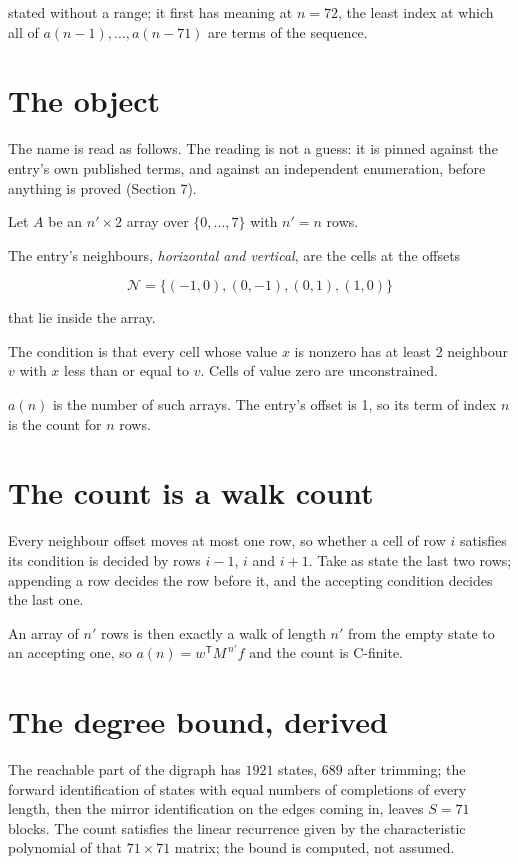 \documentclass[11pt]{article}
\theoremstyle{definition}
\begin{document}
stated without a range; it first has meaning at $n = 72$, the least index at which all of $a(n-1),\dots,a(n-71)$ are terms of the sequence.

\section{The object}

The name is read as follows. The reading is not a guess: it is pinned against the entry's own published terms, and against an independent enumeration, before anything is proved (Section 7).

Let $A$ be an $n' \times 2$ array over $\{0,\dots,7\}$ with $n' = n$ rows.

The entry's neighbours, {\itshape horizontal and vertical}, are the cells at the offsets

\[\mathcal{N} = \{(-1,0), (0,-1), (0,1), (1,0)\}\]

that lie inside the array.

The condition is that every cell whose value $x$ is nonzero has at least 2 neighbour $v$ with $x$ less than or equal to $v$. Cells of value zero are unconstrained.

$a(n)$ is the number of such arrays. The entry's offset is 1, so its term of index $n$ is the count for $n$ rows.

\section{The count is a walk count}

Every neighbour offset moves at most one row, so whether a cell of row $i$ satisfies its condition is decided by rows $i-1$, $i$ and $i+1$. Take as state the last two rows; appending a row decides the row before it, and the accepting condition decides the last one.

An array of $n'$ rows is then exactly a walk of length $n'$ from the empty state to an accepting one, so $a(n) = w^{\mathsf T}M^{\,n'}f$ and the count is C-finite.

\section{The degree bound, derived}

The reachable part of the digraph has $1921$ states, $689$ after trimming; the forward identification of states with equal numbers of completions of every length, then the mirror identification on the edges coming in, leaves $S = 71$ blocks. The count satisfies the linear recurrence given by the characteristic polynomial of that $71\times71$ matrix; the bound is computed, not assumed.
\end{document}
